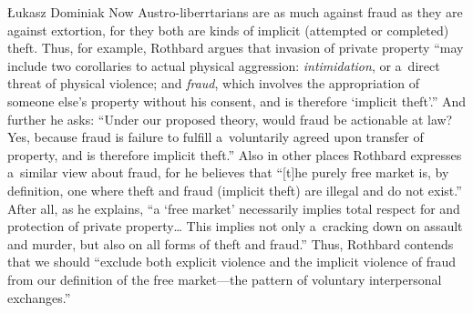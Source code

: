 \begin{artengenv}{Łukasz Dominiak}
Now Austro-liberrtarians are as much against fraud as they are against extortion, for they both are kinds of implicit (attempted or completed) theft. Thus, for example, Rothbard 
\parencite*[][p.77]{rothbard_ethics_1998} %
 argues that invasion of private property ``may include two corollaries to actual physical aggression: \textit{intimidation}, or a~direct threat of physical violence; and \textit{fraud}, which involves the appropriation of someone else's property without his consent, and is therefore ‘implicit theft'.'' And further he asks: ``Under our proposed theory, would fraud be actionable at law? Yes, because fraud is failure to fulfill a~voluntarily agreed upon transfer of property, and is therefore implicit theft.'' 
\parencite[][p.143]{rothbard_ethics_1998} %
 Also in other places Rothbard expresses a~similar view about fraud, for he 
\parencite*[][p.803]{rothbard_man_2009} %
 believes that ``[t]he purely free market is, by definition, one where theft and fraud (implicit theft) are illegal and do not exist.'' After all, as he 
\parencite[][p.216]{rothbard_toward_2011} %
 explains, ``a ‘free market' necessarily implies total respect for and protection of private property… This implies not only a~cracking down on assault and murder, but also on all forms of theft and fraud.'' Thus, Rothbard 
\parencite*[][p.184]{rothbard_man_2009} %
 contends that we should ``exclude both explicit violence and the implicit violence of fraud from our definition of the free market---the pattern of voluntary interpersonal exchanges.''




\end{artengenv}
